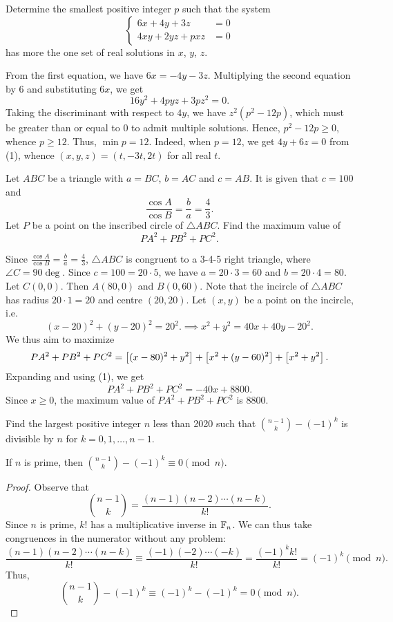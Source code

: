 \begin{question}[12]\label{A::2020-O-1-16}
    Determine the smallest positive integer $p$ such that the system \[\left\{
    \begin{aligned}
        6x + 4y + 3z &= 0\\
        4xy + 2yz + pxz &= 0
    \end{aligned}\right.\] has more the one set of real solutions in $x$, $y$, $z$.
\end{question}

From the first equation, we have $6x = -4y - 3z$. Multiplying the second equation by 6 and substituting $6x$, we get \[16y^2 + 4pyz + 3pz^2 = 0. \tag{1}\] Taking the discriminant with respect to $4y$, we have $z^2(p^2 - 12p)$, which must be greater than or equal to 0 to admit multiple solutions. Hence, $p^2 - 12p \geq 0$, whence $p \geq 12$. Thus, $\min p = 12$. Indeed, when $p = 12$, we get $4y + 6z = 0$ from (1), whence $(x, y, z) = (t, -3t, 2t)$ for all real $t$.

\begin{question}[8800]\label{A::2020-O-1-17}
    Let $ABC$ be a triangle with $a = BC$, $b = AC$ and $c = AB$. It is given that $c = 100$ and \[\frac{\cos A}{\cos B} = \frac{b}{a} = \frac43.\] Let $P$ be a point on the inscribed circle of $\triangle ABC$. Find the maximum value of \[PA^2 + PB^2 + PC^2.\]
\end{question}

Since $\frac{\cos A}{\cos B} = \frac{b}{a} = \frac43$, $\triangle ABC$ is congruent to a 3-4-5 right triangle, where $\angle C = 90\deg$. Since $c = 100 = 20 \cdot 5$, we have $a = 20 \cdot 3 = 60$ and $b = 20 \cdot 4 = 80$. Let $C(0,0)$. Then $A(80, 0)$ and $B(0, 60)$. Note that the incircle of $\triangle ABC$ has radius $20 \cdot 1 = 20$ and centre $(20, 20)$. Let $(x, y)$ be a point on the incircle, i.e. \[(x-20)^2 + (y-20)^2 = 20^2.\implies x^2 + y^2 = 40x + 40y - 20^2 \tag{1}.\] We thus aim to maximize \[PA^2 + PB^2 + PC^2 = \left[ (x-80)^2 + y^2 \right] + \left[ x^2 + (y-60)^2 \right] + \left[ x^2 + y^2 \right].\] Expanding and using (1), we get \[PA^2 + PB^2 + PC^2 = -40x + 8800.\] Since $x \geq 0$, the maximum value of $PA^2 + PB^2 + PC^2$ is 8800.

\begin{question}[2017]\label{A::2020-O-1-18}
    Find the largest positive integer $n$ less than 2020 such that $\binom{n-1}{k} - (-1)^k$ is divisible by $n$ for $k = 0, 1, \ldots, n-1$.
\end{question}

\begin{claim}{1}
    If $n$ is prime, then $\binom{n-1}{k} - (-1)^k \equiv 0 \pmod{n}$.
\end{claim}
\begin{proof}
    Observe that \[\binom{n-1}{k} = \frac{(n-1)(n-2)\cdots(n-k)}{k!}.\] Since $n$ is prime, $k!$ has a multiplicative inverse in $\mathbb{F}_n$. We can thus take congruences in the numerator without any problem: \[\frac{(n-1)(n-2)\cdots(n-k)}{k!} \equiv \frac{(-1)(-2)\cdots(-k)}{k!} = \frac{(-1)^k k!}{k!} = (-1)^k \pmod{n}.\] Thus, \[\binom{n-1}{k} - (-1)^k \equiv (-1)^k - (-1)^k = 0 \pmod{n}.\]
\end{proof}


